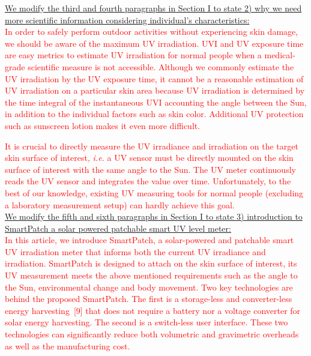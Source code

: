 \documentclass[onecolumn]{IEEEconf}
\begin{document}
\begin{description}
\uline{We modify the third and fourth paragraphs in Section I to state 2) why we need more scientific information considering individual's characteristics:}\\
%
\textcolor{red}{In order to safely perform outdoor activities without experiencing skin damage, we should be aware of  the maximum UV irradiation. UVI and UV exposure time are easy metrics to estimate UV irradiation for normal people when a medical-grade scientific measure is not accessible. Although we commonly estimate the UV irradiation by the UV exposure time, it cannot be a reasonable estimation of UV irradiation on a particular skin area because UV irradiation is determined by the time integral of the instantaneous UVI accounting the angle between the Sun, in addition to the individual factors such as skin color. Additional UV protection such as sunscreen lotion makes it even more difficult.} 

\textcolor{red}{It is crucial to directly measure the UV irradiance and irradiation on the target skin surface of interest, \textit{i.e.} a UV sensor must be directly mounted on the skin surface of interest with the same angle to the Sun. The UV meter continuously reads the UV sensor and integrates the value over time. Unfortunately, to the best of our knowledge, existing UV measuring tools for normal people (excluding a laboratory measurement setup) can hardly achieve this goal.}\\

\uline{We modify the fifth and sixth paragraphs in Section I to state 3) introduction to SmartPatch a solar powered patchable smart UV level meter:}\\
%
\textcolor{red}{In this article, we introduce SmartPatch, a solar-powered and patchable smart UV irradiation meter that informs both the current UV irradiance and irradiation. SmartPatch is designed to attach on the skin surface of interest, its UV measurement meets the above mentioned requirements such as the angle to the Sun, environmental change and body movement. Two key technologies are behind the proposed SmartPatch. The first is a storage-less and converter-less energy harvesting~[9] that does not require a battery nor a voltage converter for solar energy harvesting. The second is a switch-less user interface. These two technologies can significantly reduce both volumetric and gravimetric overheads as well as the manufacturing cost.}


\end{description}
\end{document}
